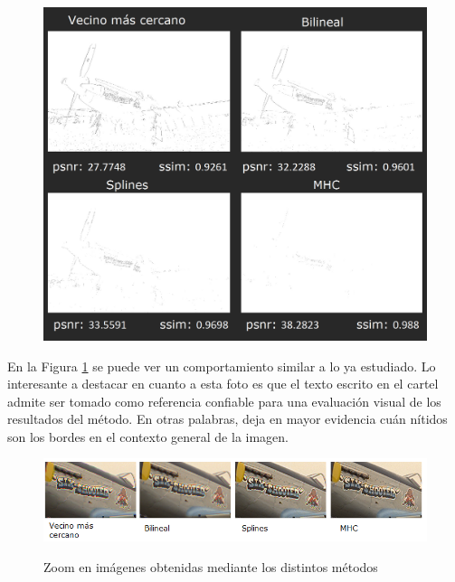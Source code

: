 \documentclass[a4paper]{article}
\begin{document}
\begin{figure}[h!]
    \caption{}
    \begin{center}
    \includegraphics[scale=0.40]{imagenes/comparacion/09/collage}
    \label{imagen9}
  \end{center}
\end{figure}

\newpage

En la Figura \ref{imagen9} se puede ver un comportamiento similar a lo ya estudiado. Lo interesante a destacar en cuanto a esta foto es que el texto escrito en el cartel admite ser tomado como referencia confiable para una evaluación visual de los resultados del método. En otras palabras, deja en mayor evidencia cuán nítidos son los bordes en el contexto general de la imagen.



\begin{figure}[h!]
    \caption{Zoom en imágenes obtenidas mediante los distintos métodos}
    \begin{center}
    \includegraphics[scale=0.9]{imagenes/comparacion/09/cartel}
    \label{cartel}
  \end{center}
\end{figure}
\end{document}
